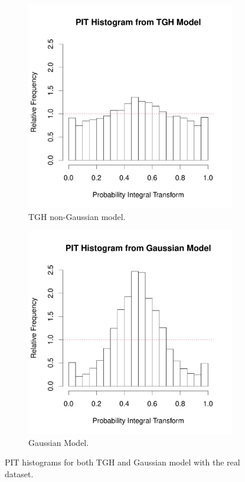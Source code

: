 \documentclass[conference]{IEEEtran}
\begin{document}
\begin{figure}[h]
\centering
\begin{subfigure}{.25\textwidth}
  \centering
  \includegraphics[width=\linewidth]{./figures/PIT_real_nongaussian.pdf}
   \caption{TGH non-Gaussian model.}
\end{subfigure}%
\begin{subfigure}{.25\textwidth}
  \centering
  \includegraphics[width=\linewidth]{./figures/PIT_real_Gaussian.pdf}
  \caption{Gaussian Model.}
\end{subfigure}
  \caption{PIT histograms for both TGH and Gaussian model with the real dataset. }
  \label{fig:PIT_real}
\end{figure}
\end{document}
